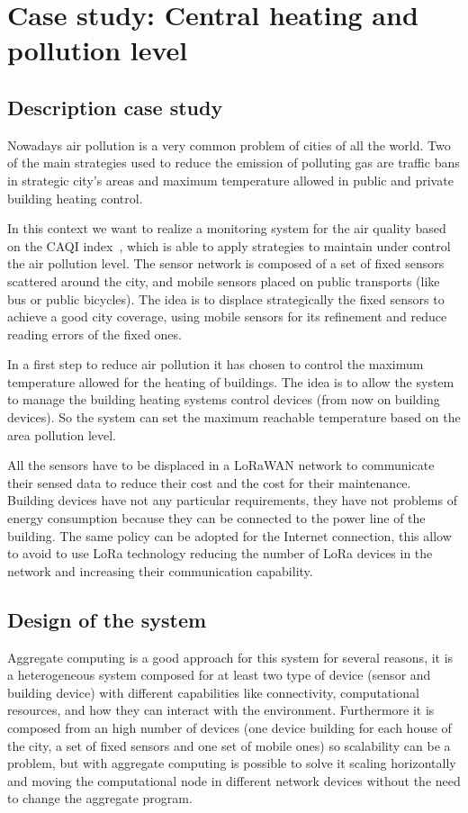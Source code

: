 \chapter{Case study: Central heating and pollution level}
\label{chap:case-staudyAC}

\section{Description case study}
Nowadays air pollution is a very common problem of cities of all the world.
Two of the main strategies used to reduce the emission of polluting gas are traffic bans in strategic city's areas and maximum temperature allowed in public and private building heating control.

In this context we want to realize a monitoring system for the air quality based on the CAQI index~\cite{CAQI}, which is able to apply strategies to maintain under control the air pollution level.
The sensor network is composed of a set of fixed sensors scattered around the city, and mobile sensors placed on public transports (like bus or public bicycles).
The idea is to displace strategically the fixed sensors to achieve a good city coverage, using mobile sensors for its refinement and reduce reading errors of the fixed ones.

In a first step to reduce air pollution it has chosen to control the maximum temperature allowed for the heating of buildings.
The idea is to allow the system to manage the building heating systems control devices (from now on building devices). So the system can set the maximum reachable temperature based on the area pollution level.

All the sensors have to be displaced in a LoRaWAN network to communicate their sensed data to reduce their cost and the cost for their maintenance. 
Building devices have not any particular requirements, they have not problems of energy consumption because they can be connected to the power line of the building.
The same policy can be adopted for the Internet connection, this allow to avoid to use LoRa technology reducing the number of LoRa devices in the network and increasing their communication capability.

\section{Design of the system}

Aggregate computing is a good approach for this system for several reasons, it is a heterogeneous system composed for at least two type of device (sensor and building device) with different capabilities like connectivity, computational resources, and how they can interact with the environment. 
Furthermore it is composed from an high number of devices (one device building for each house of the city, a set of fixed sensors and one set of mobile ones) so scalability can be a problem, but with aggregate computing is possible to solve it scaling horizontally and moving the computational node in different network devices without the need to change the aggregate program.

